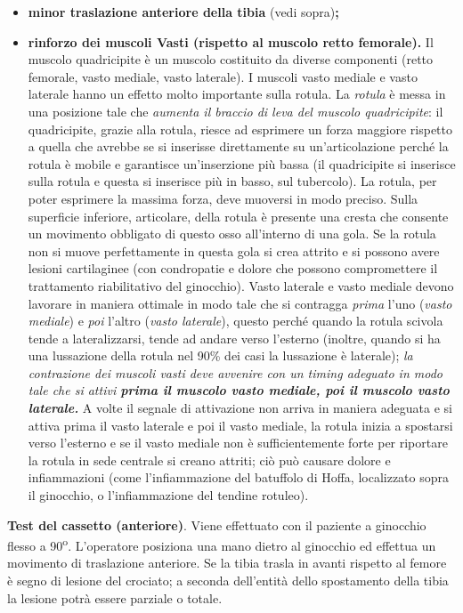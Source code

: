 \begin{itemize}
\item
  \textbf{minor traslazione anteriore della tibia} (vedi
  sopra)\textbf{;}
 \item 
  \textbf{rinforzo dei muscoli Vasti (rispetto al muscolo retto
  femorale).} Il muscolo quadricipite è un muscolo costituito da diverse
  componenti (retto femorale, vasto mediale, vasto laterale). I muscoli
  vasto mediale e vasto laterale hanno un effetto molto importante sulla
  rotula. La \emph{rotula} è messa in una posizione tale che
  \emph{aumenta il braccio di leva del muscolo quadricipite}: il
  quadricipite, grazie alla rotula, riesce ad esprimere un forza
  maggiore rispetto a quella che avrebbe se si inserisse direttamente su
  un'articolazione perché la rotula è mobile e garantisce un'inserzione
  più bassa (il quadricipite si inserisce sulla rotula e questa si
  inserisce più in basso, sul tubercolo). La rotula, per poter esprimere
  la massima forza, deve muoversi in modo preciso. Sulla superficie
  inferiore, articolare, della rotula è presente una cresta che consente
  un movimento obbligato di questo osso all'interno di una gola. Se la
  rotula non si muove perfettamente in questa gola si crea attrito e si
  possono avere lesioni cartilaginee (con condropatie e dolore che
  possono compromettere il trattamento riabilitativo del ginocchio).
  Vasto laterale e vasto mediale devono lavorare in maniera ottimale in
  modo tale che si contragga \emph{prima} l'uno (\emph{vasto mediale}) e
  \emph{poi} l'altro (\emph{vasto laterale}), questo perché quando la
  rotula scivola tende a lateralizzarsi, tende ad andare verso l'esterno
  (inoltre, quando si ha una lussazione della rotula nel 90\% dei casi
  la lussazione è laterale); \emph{la contrazione dei muscoli vasti deve
  avvenire con un timing adeguato in modo tale che si attivi
  \textbf{prima il muscolo vasto mediale, poi il muscolo vasto
  laterale.}} A volte il segnale di attivazione non arriva in maniera
  adeguata e si attiva prima il vasto laterale e poi il vasto mediale,
  la rotula inizia a spostarsi verso l'esterno e se il vasto mediale non
  è sufficientemente forte per riportare la rotula in sede centrale si
  creano attriti; ciò può causare dolore e infiammazioni (come
  l'infiammazione del batuffolo di Hoffa, localizzato sopra il
  ginocchio, o l'infiammazione del tendine rotuleo).
\end{itemize}

\textbf{Test del cassetto (anteriore)}. Viene effettuato con il paziente
a ginocchio flesso a 90\textsuperscript{o}. L'operatore posiziona una mano dietro al
ginocchio ed effettua un movimento di traslazione anteriore. Se la tibia
trasla in avanti rispetto al femore è segno di lesione del crociato; a
seconda dell'entità dello spostamento della tibia la lesione potrà
essere parziale o totale.

